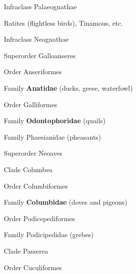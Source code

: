 \documentclass[10pt]{article}
\newlength\mylength
\newcommand*{\growparindent}{\addtolength{\parindent}{\mylength}}
\newcommand*{\reduceparindent}{\addtolength{\parindent}{-1\mylength}}
\begin{document}
\begin{multicols}{2}

\begin{spacing}{1.35}

Infraclass Palaeognathae

  \growparindent
  Ratites (flightless birds), Tinamous, etc.



\reduceparindent
Infraclass Neognathae

  \growparindent
  Superorder Galloanseres

	\growparindent

    Order Anseriformes
     
     	\growparindent
     	
     	Family \textbf{Anatidae} (ducks, geese, waterfowl)
     	
 
    \reduceparindent
    
    Order Galliformes
     
     	\growparindent
     
 	    Family \textbf{Odontophoridae} (quails)
     
     	Family Phaesianidae (pheasants)

 
\reduceparindent

\reduceparindent
Superorder Neoaves
  
  \growparindent
  
    Clade Columbea

	\growparindent
	
    Order Columbiformes
    
    	\growparindent
    	
    	Family \textbf{Columbidae} (doves and pigeons)
    	
    \reduceparindent
      
    Order Podicepediformes
    
    	\growparindent
    	
    	Family Podicipedidae (grebes)


    \reduceparindent
    
    \reduceparindent

    Clade Passerea
    
    	\growparindent
     	Order Cuculiformes
      
	      \growparindent
      

\end{spacing}
\end{multicols}
\end{document}
